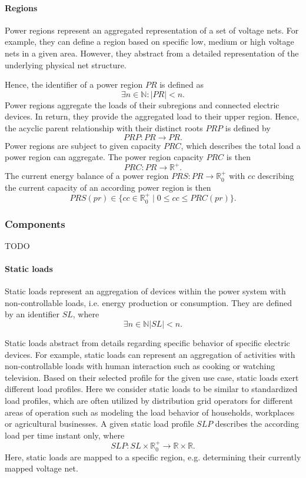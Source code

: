 \paragraph{Regions}
\label{regions}

Power regions represent an aggregated representation of a set of voltage nets. For example, they can define a region based on specific low, medium or high voltage nets in a given area. However, they abstract from a detailed representation of the underlying physical net structure.  

Hence, the identifier of a power region $PR$ is defined as
\[
\exists n \in \mathbb{N} : |PR| < n \mathrm{.}
\]
Power regions aggregate the loads of their subregions and connected electric devices. In return, they provide the aggregated load to their upper region.
Hence, the acyclic parent relationship with their distinct roots $PRP$ is defined by 
\[
PRP : PR \to PR \mathrm{.}
\]
Power regions are subject to given capacity $PRC$, which describes the total load a power region can aggregate.
The power region capacity $PRC$ is then
\[
PRC : PR \rightarrow \mathbb{R}^+ \mathrm{.}
\]
The current energy balance of a power region
$PRS : PR \rightarrow \mathbb{R}_0^+$ with $cc$ describing the current capacity of an according power region is then
\[
PRS(pr) \in \{ cc \in \mathbb{R}_0^+ \mid 0 \leq cc \leq PRC(pr) \} \mathrm{.}
\]

\subsubsection{Components}
\label{components}

TODO

\paragraph{Static loads}
\label{static_loads}

Static loads represent an aggregation of devices within the power system with non-controllable loads, i.e. energy production or consumption. They are defined by an identifier $SL$, where 
\[
\exists n \in \mathbb{N} |SL| < n \mathrm{.}
\]

Static loads abstract from details regarding specific behavior of specific electric devices. For example, static loads can represent an aggregation of activities with non-controllable loads with human interaction such as cooking or watching television. Based on their selected profile for the given use case, static loads exert different load profiles. Here we consider static loads to be similar to standardized load profiles, which are often utilized by distribution grid operators for different areas of operation such as modeling the load behavior of households, workplaces or agricultural businesses. A given static load profile $SLP$ describes the according load per time instant only, where
\[
SLP : SL \times \mathbb{R}_0^+ \rightarrow \mathbb{R} \times \mathbb{R} \mathrm{.}
\]
Here, static loads are mapped to a specific region, e.g. determining their currently mapped voltage net.


